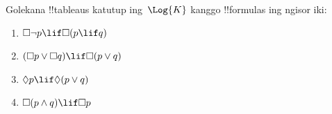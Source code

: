 \documentclass[../../../include/open-logic-section]{subfiles}
\begin{document}
\begin{prob}
  Golekana !!{tableau}s katutup ing~$\Log{K}$ kanggo !!{formula}s ing ngisor iki:
  \begin{enumerate}
    \item $\Box \lnot p \lif \Box(p \lif q)$
    \item $(\Box p \lor \Box q) \lif \Box(p \lor q)$
    \item $\Diamond p \lif \Diamond(p \lor q)$
    \item $\Box(p \land q) \lif \Box p$
  \end{enumerate}
\end{prob}
\end{document}
